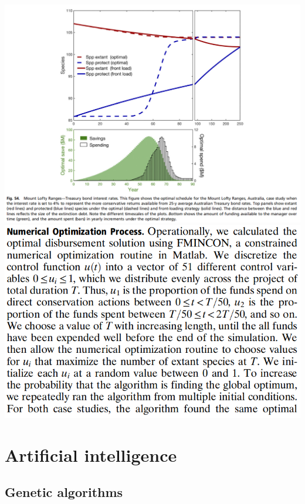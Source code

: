 \documentclass[12pt]{article}
\begin{document}
\begin{center}
	\includegraphics[scale=0.35]{resultsMLR.png}
	\includegraphics[scale=0.5]{optimisationprocess.png}
\end{center}

\section{Artificial intelligence}

\subsection{Genetic algorithms}
\end{document}
